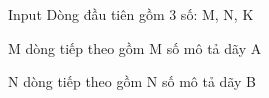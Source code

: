 Input
Dòng đầu tiên gồm 3 số: M, N, K  

   M dòng tiếp theo gồm M số mô tả dãy A  

   N dòng tiếp theo gồm N số mô tả dãy B